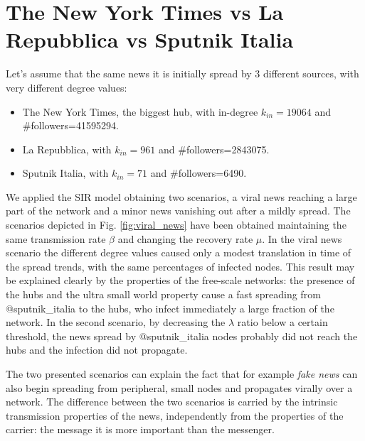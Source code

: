       






\section{The New York Times vs La Repubblica vs Sputnik Italia}

Let's assume that the same news it is initially spread by 3 different sources, with very different degree values:
\begin{itemize}
\item The New York Times, the biggest hub,  with in-degree $k_{in}=19064$  and \#followers=41595294.
\item La Repubblica, with $k_{in}=961$ and \#followers=2843075.
\item Sputnik Italia, with $k_{in}=71$ and \#followers=6490.  
\end{itemize}
We applied the SIR model obtaining two scenarios, a viral news reaching a large part of the network and a minor news vanishing 
out after a mildly spread. The scenarios depicted in Fig. \ref{fig:viral_news} have been obtained maintaining the same transmission rate $\beta$ and changing the recovery rate $\mu$.
In the viral news scenario the different degree values caused only a modest translation in time of the spread trends, with the same percentages
of infected nodes. This result may be explained clearly by the properties of the free-scale networks: the presence of the hubs and the ultra small world property cause a fast spreading from @sputnik\_italia to the hubs, who infect immediately a large fraction of the network.
In the second scenario, by decreasing the $\lambda$ ratio below a certain threshold, the news spread by @sputnik\_italia nodes probably did not reach the hubs and the infection did not propagate.

The two presented scenarios can explain the fact that for example \textit{fake news} can also begin spreading from peripheral, small nodes and propagates virally over a network. The difference between the two scenarios is carried by the intrinsic transmission properties of the news,
independently from the properties of the carrier: the message it is more important than the messenger.

